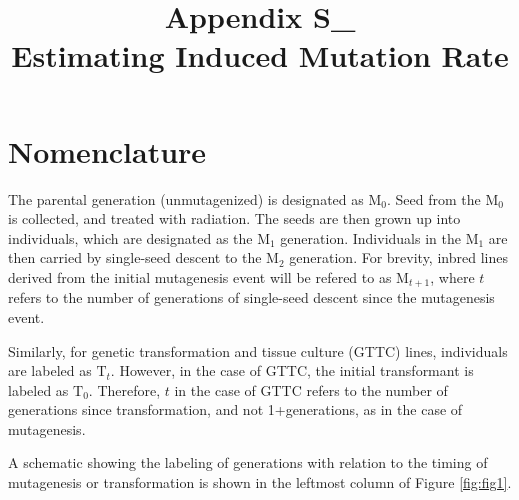 \documentclass[12pt]{article}
\begin{document}
\title{Appendix S\_ \\ Estimating Induced Mutation Rate}
\author{}
\date{}
\maketitle
\renewcommand\thefigure{A\arabic{figure}}
\section*{Nomenclature}
\par The parental generation (unmutagenized) is designated as $\mathrm{M}_{0}$.
Seed from the $\mathrm{M}_{0}$ is collected, and treated with radiation. The
seeds are then grown up into individuals, which are designated as the
$\mathrm{M}_{1}$ generation. Individuals in the $\mathrm{M}_{1}$ are then
carried by single-seed descent to the $\mathrm{M}_{2}$ generation. For brevity,
inbred lines derived from the initial mutagenesis event will be refered to as
$\mathrm{M}_{t+1}$, where $t$ refers to the number of generations of
single-seed descent since the mutagenesis event.

\par Similarly, for genetic transformation and tissue culture (GTTC) lines,
individuals are labeled as $\mathrm{T}_{t}$. However, in the case of GTTC,
the initial transformant is labeled as $\mathrm{T}_{0}$. Therefore, $t$ in the
case of GTTC refers to the number of generations since transformation, and not
1+generations, as in the case of mutagenesis.

\par A schematic showing the labeling of generations with relation to the
timing of mutagenesis or transformation is shown in the leftmost column of
Figure \ref{fig:fig1}.
\end{document}

